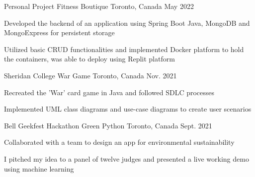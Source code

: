 \begin{cventries}
  \cventry
    {Personal Project}
    {Fitness Boutique}
    {Toronto, Canada}
    {May 2022}
    {
      \begin{cvitems}
        \item {Developed the backend of an application using Spring Boot Java, MongoDB and MongoExpress for persistent storage
        \item Utilized basic CRUD functionalities and implemented Docker platform to hold the containers, was able to deploy using Replit platform}      
        \end{cvitems}
    }
  \cventry
    {Sheridan College}
    {War Game}
    {Toronto, Canada}
    {Nov. 2021}
    {
      \begin{cvitems}
        \item {Recreated the 'War' card game in Java and followed SDLC processes
        \item  Implemented UML class diagrams and use-case diagrams to create user scenarios}
      \end{cvitems}
    }
  \cventry
    {Bell Geekfest Hackathon}
    {Green Python}
    {Toronto, Canada}
    {Sept. 2021}
    {
      \begin{cvitems}
        \item {Collaborated with a team to design an app for environmental sustainability
        \item I pitched my idea to a panel of twelve judges and presented a live working demo using machine learning}      
        \end{cvitems}
    }
\end{cventries}